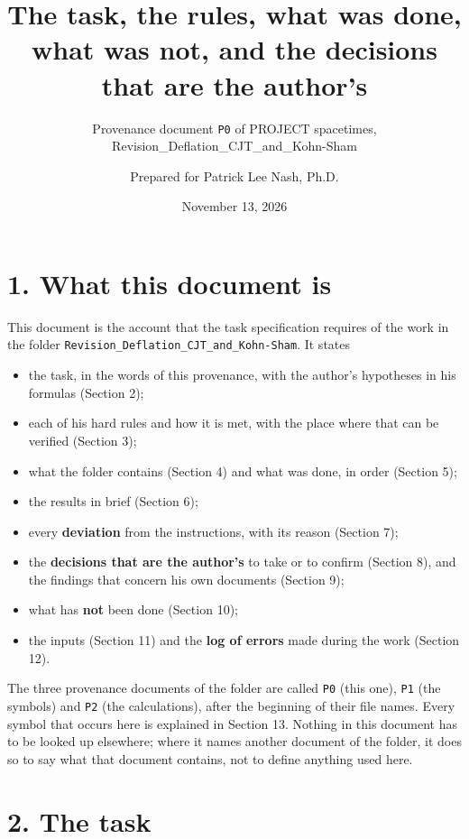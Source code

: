 \documentclass[
  10pt,
]{article}
\title{The task, the rules, what was done, what was not, and the
decisions that are the author's}
\subtitle{Provenance document \texttt{P0} of PROJECT spacetimes,
Revision\_Deflation\_CJT\_and\_Kohn-Sham}
\author{Prepared for Patrick Lee Nash, Ph.D.}
\date{November 13, 2026}
\providecommand{\tightlist}{%
  \setlength{\itemsep}{0pt}\setlength{\parskip}{0pt}}
\begin{document}
\maketitle

\hypertarget{what-this-document-is}{%
\section{1. What this document is}\label{what-this-document-is}}

This document is the account that the task specification requires of the
work in the folder \texttt{Revision\_Deflation\_CJT\_and\_Kohn-Sham}. It
states

\begin{itemize}
\tightlist
\item
  the task, in the words of this provenance, with the author's
  hypotheses in his formulas (Section 2);
\item
  each of his hard rules and how it is met, with the place where that
  can be verified (Section 3);
\item
  what the folder contains (Section 4) and what was done, in order
  (Section 5);
\item
  the results in brief (Section 6);
\item
  every \textbf{deviation} from the instructions, with its reason
  (Section 7);
\item
  the \textbf{decisions that are the author's} to take or to confirm
  (Section 8), and the findings that concern his own documents (Section
  9);
\item
  what has \textbf{not} been done (Section 10);
\item
  the inputs (Section 11) and the \textbf{log of errors} made during the
  work (Section 12).
\end{itemize}

The three provenance documents of the folder are called \texttt{P0}
(this one), \texttt{P1} (the symbols) and \texttt{P2} (the
calculations), after the beginning of their file names. Every symbol
that occurs here is explained in Section 13. Nothing in this document
has to be looked up elsewhere; where it names another document of the
folder, it does so to say what that document contains, not to define
anything used here.

\hypertarget{the-task}{%
\section{2. The task}\label{the-task}}
\end{document}
